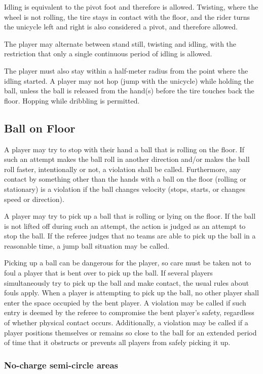 Idling is equivalent to the pivot foot and therefore is allowed.
Twisting, where the wheel is not rolling, the tire stays in contact with the floor, and the rider turns the unicycle left and right is also considered a pivot, 
and therefore allowed.

The player may alternate between stand still, twisting and idling, with the restriction that only a single continuous period of idling is allowed.

The player must also stay within a half-meter radius from the point where the idling started.
A player may not hop (jump with the unicycle) while holding the ball, unless the ball is released from the hand(s) before the tire touches back the floor.
Hopping while dribbling is permitted.

\subsection{Ball on Floor}
A player may try to stop with their hand a ball that is rolling on the floor. If such an attempt makes the ball roll in another direction and/or makes the ball roll
faster, intentionally or not, a violation shall be called. Furthermore, any contact by something other than the hands with a ball on the floor (rolling or stationary)
is a violation if the ball changes velocity (stops, starts, or changes speed or direction).

A player may try to pick up a ball that is rolling or lying on the floor. If the ball is not lifted off during such an attempt, the action is judged as an attempt 
to stop the ball. If the referee judges that no teams are able to pick up the ball in a reasonable time, a jump ball situation may be called.

Picking up a ball can be dangerous for the player, so care must be taken not to foul a player that is bent over to pick up the ball. 
If several players simultaneously try to pick up the ball and make contact, the usual rules about fouls apply. 
When a player is attempting to pick up the ball, no other player shall enter the space occupied by the bent player. 
A violation may be called if such entry is deemed by the referee to compromise the bent player's safety, regardless of whether physical contact occurs. 
Additionally, a violation may be called if a player positions themselves or remains so close to the ball for an extended period of time that it obstructs or 
prevents all players from safely picking it up.

\subsubsection{No-charge semi-circle areas}

